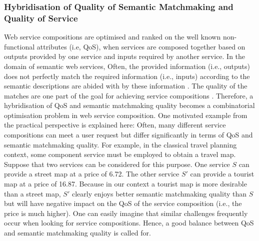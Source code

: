 \subsubsection{Hybridisation of Quality of Semantic Matchmaking and Quality of Service}
Web service compositions are optimised and ranked on the well known non-functional attributes (i.e, QoS), when services are composed together based on outputs provided by one service and inputs required by another service. In the domain of semantic web services, Often, the provided information (i.e., outputs) does not perfectly match the required information (i.e., inputs) according to the semantic descriptions are abided with by these information \cite{lecue2008optimizing}. The quality of the matches are one part of the goal for achieving service compositions \cite{lecue2009optimizing}. Therefore, a hybridisation of QoS and semantic matchmaking quality becomes a combinatorial optimisation problem in web service composition. One motivated example from the practical perspective is explained here: Often, many different service compositions can meet a user request but differ significantly in terms of QoS and semantic matchmaking quality. For example, in the classical travel planning context, some component service must be employed to obtain a travel map. Suppose that two services can be considered for this purpose. One service $S$ can provide a street map at a price of 6.72. The other service $S'$ can provide a tourist map at a price of 16.87. Because in our context a tourist map is more desirable than a street map, $S'$ clearly enjoys better semantic matchmaking quality than $S$ but will have negative impact on the QoS of the service composition (i.e., the price is much higher). One can easily imagine that similar challenges frequently occur when looking for service compositions. Hence, a good balance between QoS and semantic matchmaking quality is called for.

